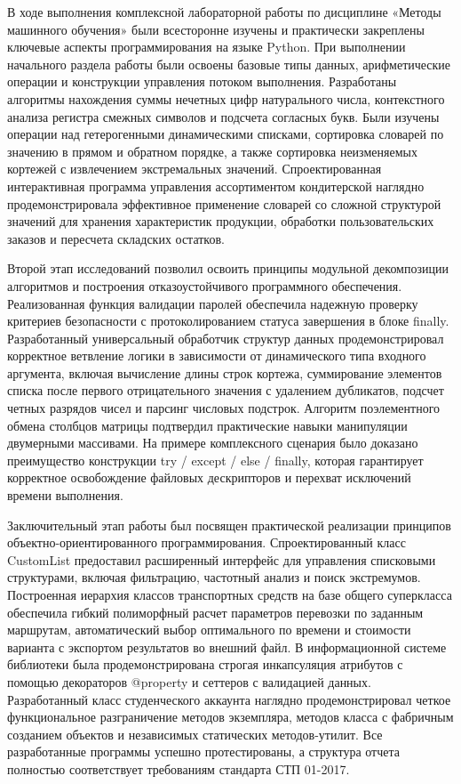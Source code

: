 \documentclass[14pt,a4paper]{extarticle}
\begin{document}
В ходе выполнения комплексной лабораторной работы по дисциплине «Методы машинного обучения» были всесторонне изучены и практически закреплены ключевые аспекты программирования на языке Python. При выполнении начального раздела работы были освоены базовые типы данных, арифметические операции и конструкции управления потоком выполнения. Разработаны алгоритмы нахождения суммы нечетных цифр натурального числа, контекстного анализа регистра смежных символов и подсчета согласных букв. Были изучены операции над гетерогенными динамическими списками, сортировка словарей по значению в прямом и обратном порядке, а также сортировка неизменяемых кортежей с извлечением экстремальных значений. Спроектированная интерактивная программа управления ассортиментом кондитерской наглядно продемонстрировала эффективное применение словарей со сложной структурой значений для хранения характеристик продукции, обработки пользовательских заказов и пересчета складских остатков.

Второй этап исследований позволил освоить принципы модульной декомпозиции алгоритмов и построения отказоустойчивого программного обеспечения. Реализованная функция валидации паролей обеспечила надежную проверку критериев безопасности с протоколированием статуса завершения в блоке finally. Разработанный универсальный обработчик структур данных продемонстрировал корректное ветвление логики в зависимости от динамического типа входного аргумента, включая вычисление длины строк кортежа, суммирование элементов списка после первого отрицательного значения с удалением дубликатов, подсчет четных разрядов чисел и парсинг числовых подстрок. Алгоритм поэлементного обмена столбцов матрицы подтвердил практические навыки манипуляции двумерными массивами. На примере комплексного сценария было доказано преимущество конструкции try / except / else / finally, которая гарантирует корректное освобождение файловых дескрипторов и перехват исключений времени выполнения.

Заключительный этап работы был посвящен практической реализации принципов объектно-ориентированного программирования. Спроектированный класс CustomList предоставил расширенный интерфейс для управления списковыми структурами, включая фильтрацию, частотный анализ и поиск экстремумов. Построенная иерархия классов транспортных средств на базе общего суперкласса обеспечила гибкий полиморфный расчет параметров перевозки по заданным маршрутам, автоматический выбор оптимального по времени и стоимости варианта с экспортом результатов во внешний файл. В информационной системе библиотеки была продемонстрирована строгая инкапсуляция атрибутов с помощью декораторов @property и сеттеров с валидацией данных. Разработанный класс студенческого аккаунта наглядно продемонстрировал четкое функциональное разграничение методов экземпляра, методов класса с фабричным созданием объектов и независимых статических методов-утилит. Все разработанные программы успешно протестированы, а структура отчета полностью соответствует требованиям стандарта СТП 01-2017.
\end{document}

